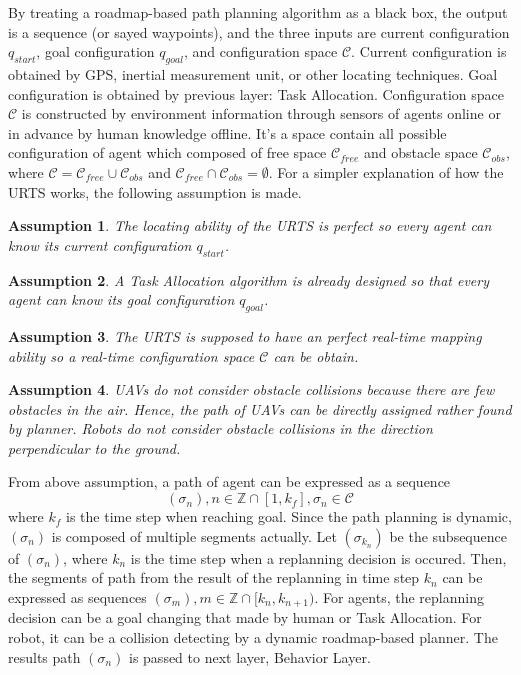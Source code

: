 \documentclass{ieeeaccess}
\newtheorem{assumption}{Assumption}[section]
\begin{document}
By treating a roadmap-based path planning algorithm as a black box, the output is a sequence (or sayed waypoints), and the three inputs are current configuration $q_{start}$, goal configuration $q_{goal}$, and configuration space $\mathcal{C}$. Current configuration is obtained by GPS, inertial measurement unit, or other locating techniques. Goal configuration is obtained by previous layer: Task Allocation. Configuration space $\mathcal{C}$ is constructed by environment information through sensors of agents online or in advance by human knowledge offline. It's a space contain all possible configuration of agent which composed of free space $\mathcal{C}_{free}$ and obstacle space $\mathcal{C}_{obs}$, where $\mathcal{C}=\mathcal{C}_{free}\cup\mathcal{C}_{obs}$ and $\mathcal{C}_{free}\cap\mathcal{C}_{obs}=\emptyset$. For a simpler explanation of how the URTS works, the following assumption is made.
\begin{assumption}
    The locating ability of the URTS is perfect so every agent can know its current configuration $q_{start}$.
\end{assumption}
\begin{assumption}
    A Task Allocation algorithm is already designed so that every agent can know its goal configuration $q_{goal}$.
\end{assumption}
\begin{assumption}
    The URTS is supposed to have an perfect real-time mapping ability so a real-time configuration space $\mathcal{C}$ can be obtain.
\end{assumption}
\begin{assumption} \label{asm:collision}
    UAVs do not consider obstacle collisions because there are few obstacles in the air. Hence, the path of UAVs can be directly assigned rather found by planner. Robots do not consider obstacle collisions in the direction perpendicular to the ground. 
\end{assumption}
From above assumption, a path of agent can be expressed as a sequence
\begin{equation}
    (\sigma_n), n\in\mathbb{Z}\cap[1,k_f], \sigma_n\in\mathcal{C}
\end{equation}
where $k_f$ is the time step when reaching goal. Since the path planning is dynamic, $(\sigma_n)$ is composed of multiple segments actually. Let $(\sigma_{k_n})$ be the subsequence of $(\sigma_n)$, where $k_n$ is the time step when a replanning decision is occured. Then, the segments of path from the result of the replanning in time step $k_n$ can be expressed as sequences $(\sigma_m), m\in\mathbb{Z}\cap[k_n, k_{n+1})$. For agents, the replanning decision can be a goal changing that made by human or Task Allocation. For robot, it can be a collision detecting by a dynamic roadmap-based planner. The results path $(\sigma_n)$ is passed to next layer, Behavior Layer.
\end{document}
